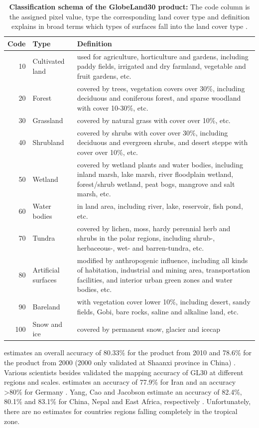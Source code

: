 			\begin{table}[ht]
				\centering
				\caption[Classification schema of the GlobeLand30 product]{\textbf{Classification schema of the GlobeLand30 product:} The code column is the assigned pixel value, type the corresponding land cover type and definition explains in broad terms which types of surfaces fall into the land cover type \citep{Chen2017}.}
				\label{tab:gl30classes}
				\begin{tabular}{rlp{10.3cm}}
					\hline
					Code & Type & Definition \\\hline
					10 & Cultivated land & used for agriculture, horticulture and gardens, including paddy fields, irrigated and dry farmland, vegetable and fruit gardens, etc. \\
					20 & Forest & covered by trees, vegetation covers over 30\%, including deciduous and coniferous forest, and sparse woodland with cover 10-30\%, etc. \\
					30 & Grassland & covered by natural grass with cover over 10\%, etc.\\
					40 & Shrubland & covered by shrubs with cover over 30\%, including deciduous and evergreen shrubs, and desert steppe with cover over 10\%, etc.\\
					50 & Wetland & covered by wetland plants and water bodies, including inland marsh, lake marsh, river floodplain wetland, forest/shrub wetland, peat bogs, mangrove and salt marsh, etc.\\
					60 & Water bodies & in land area, including river, lake, reservoir, fish pond, etc.\\
					70 & Tundra & covered by lichen, moss, hardy perennial herb and shrubs in the polar regions, including shrub-, herbaceous-, wet- and barren-tundra, etc.\\
					80 & Artificial surfaces & modified by anthropogenic influence, including all kinds of habitation, industrial and mining area, transportation facilities, and interior urban green zones and water bodies, etc.\\
					90 & Bareland & with vegetation cover lower 10\%, including desert, sandy fields, Gobi, bare rocks, saline and alkaline land, etc.\\
					100 & Snow and ice & covered by permanent snow, glacier and icecap\\\hline
				\end{tabular}
			\end{table}

			\citeauthor{Chen2015} estimates an overall accuracy of 80.33\% for the product from 2010 and 78.6\% for the product from 2000 (2000 only validated at Shaanxi province in China) \citep{Chen2015}. Various scientists besides \citeauthor{Chen2015} validated the mapping accuracy of \ac{GL30} at different regions and scales. \citeauthor{Arsanjani2016} estimates an accuracy of 77.9\% for Iran and an accuracy >80\% for Germany \citep{Arsanjani2016a,Arsanjani2016}. Yang, Cao and Jacobson estimate an accuracy of 82.4\%, 80.1\% and 83.1\% for China, Nepal and East Africa, respectively . Unfortunately, there are no estimates for countries regions falling completely in the tropical zone.

